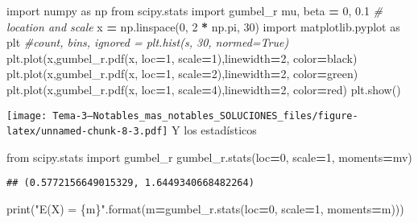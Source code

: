 \documentclass[
]{article}
\newenvironment{Shaded}{\begin{snugshade}}{\end{snugshade}}
\newcommand{\BuiltInTok}[1]{#1}
\newcommand{\CommentTok}[1]{\textcolor[rgb]{0.56,0.35,0.01}{\textit{#1}}}
\newcommand{\DecValTok}[1]{\textcolor[rgb]{0.00,0.00,0.81}{#1}}
\newcommand{\FloatTok}[1]{\textcolor[rgb]{0.00,0.00,0.81}{#1}}
\newcommand{\ImportTok}[1]{#1}
\newcommand{\NormalTok}[1]{#1}
\newcommand{\OperatorTok}[1]{\textcolor[rgb]{0.81,0.36,0.00}{\textbf{#1}}}
\newcommand{\SpecialCharTok}[1]{\textcolor[rgb]{0.00,0.00,0.00}{#1}}
\newcommand{\StringTok}[1]{\textcolor[rgb]{0.31,0.60,0.02}{#1}}
\begin{document}
\begin{Shaded}
\begin{Highlighting}[]
\ImportTok{import}\NormalTok{ numpy }\ImportTok{as}\NormalTok{ np }
\ImportTok{from}\NormalTok{ scipy.stats }\ImportTok{import}\NormalTok{ gumbel\_r}
\NormalTok{mu, beta }\OperatorTok{=} \DecValTok{0}\NormalTok{, }\FloatTok{0.1} \CommentTok{\# location and scale}
\NormalTok{x }\OperatorTok{=}\NormalTok{ np.linspace(}\DecValTok{0}\NormalTok{, }\DecValTok{2} \OperatorTok{*}\NormalTok{ np.pi, }\DecValTok{30}\NormalTok{)}
\ImportTok{import}\NormalTok{ matplotlib.pyplot }\ImportTok{as}\NormalTok{ plt}
\CommentTok{\#count, bins, ignored = plt.hist(s, 30, normed=True)}
\NormalTok{plt.plot(x,gumbel\_r.pdf(x, loc}\OperatorTok{=}\DecValTok{1}\NormalTok{, scale}\OperatorTok{=}\DecValTok{1}\NormalTok{),linewidth}\OperatorTok{=}\DecValTok{2}\NormalTok{, color}\OperatorTok{=}\StringTok{\textquotesingle{}black\textquotesingle{}}\NormalTok{)}
\NormalTok{plt.plot(x,gumbel\_r.pdf(x, loc}\OperatorTok{=}\DecValTok{1}\NormalTok{, scale}\OperatorTok{=}\DecValTok{2}\NormalTok{),linewidth}\OperatorTok{=}\DecValTok{2}\NormalTok{, color}\OperatorTok{=}\StringTok{\textquotesingle{}green\textquotesingle{}}\NormalTok{)}
\NormalTok{plt.plot(x,gumbel\_r.pdf(x, loc}\OperatorTok{=}\DecValTok{1}\NormalTok{, scale}\OperatorTok{=}\DecValTok{4}\NormalTok{),linewidth}\OperatorTok{=}\DecValTok{2}\NormalTok{, color}\OperatorTok{=}\StringTok{\textquotesingle{}red\textquotesingle{}}\NormalTok{)}
\NormalTok{plt.show()}
\end{Highlighting}
\end{Shaded}

\texttt{[image: Tema-3---Notables\_mas\_notables\_SOLUCIONES\_files/figure-latex/unnamed-chunk-8-3.pdf]}
Y los estadísticos

\begin{Shaded}
\begin{Highlighting}[]
\ImportTok{from}\NormalTok{ scipy.stats }\ImportTok{import}\NormalTok{ gumbel\_r}
\NormalTok{gumbel\_r.stats(loc}\OperatorTok{=}\DecValTok{0}\NormalTok{, scale}\OperatorTok{=}\DecValTok{1}\NormalTok{, moments}\OperatorTok{=}\StringTok{\textquotesingle{}mv\textquotesingle{}}\NormalTok{)}
\end{Highlighting}
\end{Shaded}

\begin{verbatim}
## (0.5772156649015329, 1.6449340668482264)
\end{verbatim}

\begin{Shaded}
\begin{Highlighting}[]
\BuiltInTok{print}\NormalTok{(}\StringTok{"E(X) = }\SpecialCharTok{\{m\}}\StringTok{"}\NormalTok{.}\BuiltInTok{format}\NormalTok{(m}\OperatorTok{=}\NormalTok{gumbel\_r.stats(loc}\OperatorTok{=}\DecValTok{0}\NormalTok{, scale}\OperatorTok{=}\DecValTok{1}\NormalTok{, moments}\OperatorTok{=}\StringTok{\textquotesingle{}m\textquotesingle{}}\NormalTok{)))}
\end{Highlighting}
\end{Shaded}
\end{document}
